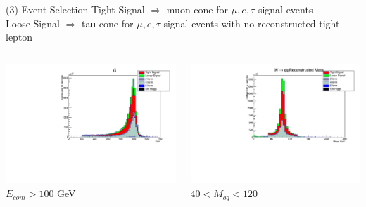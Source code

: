 \documentclass[10pt]{beamer}
\begin{document}
\begin{frame}{(3) Event Selection}
\scriptsize
Tight Signal $\Rightarrow$  muon cone for $\mu,e,\tau$ signal events\\
Loose Signal $\Rightarrow$  tau cone for $\mu,e,\tau$ signal events with no reconstructed tight lepton\\
\begin{columns}
\begin{column}{0.5\textwidth}
\includegraphics[scale=0.3, left]{EcomHist.pdf} \\
$E_{com} > 100$ GeV
\end{column}
\begin{column}{0.5\textwidth}
\includegraphics[scale=0.3, left]{mwhadHist.pdf} \\
$ 40 < M_{qq} < 120$
\end{column}
\end{columns}
\end{frame}
\end{document}
